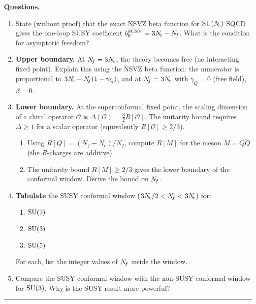 \documentclass[11pt,a4paper]{article}
\begin{document}
\medskip
\noindent\textbf{Questions.}
\begin{enumerate}[label=(\alph*)]
  \item State (without proof) that the exact NSVZ beta function for $\mathrm{SU}(N_{\!c})$
    SQCD gives the one-loop SUSY coefficient $b_0^{\mathrm{SUSY}} = 3N_{\!c} - N_{\!f}$.
    What is the condition for asymptotic freedom?

  \item \textbf{Upper boundary.}
    At $N_{\!f} = 3N_{\!c}$, the theory becomes free (no interacting fixed point).
    Explain this using the NSVZ beta function: the numerator is proportional
    to $3N_{\!c} - N_{\!f}(1 - \gamma_Q)$, and at $N_{\!f} = 3N_{\!c}$ with
    $\gamma_Q = 0$ (free field), $\beta = 0$.

  \item \textbf{Lower boundary.}
    At the superconformal fixed point, the scaling dimension of a chiral
    operator $\mathcal{O}$ is $\Delta(\mathcal{O}) = \frac{3}{2}R[\mathcal{O}]$.
    The unitarity bound requires $\Delta \geq 1$ for a scalar operator
    (equivalently $R[\mathcal{O}] \geq 2/3$).
    \begin{enumerate}[label=(\roman*)]
      \item Using $R[Q] = (N_f - N_c)/N_f$, compute $R[M]$ for the
        meson $M = Q\widetilde{Q}$ (the $R$-charges are additive).
      \item The unitarity bound $R[M] \geq 2/3$ gives the lower boundary
        of the conformal window. Derive the bound on $N_{\!f}$.
    \end{enumerate}

  \item \textbf{Tabulate} the SUSY conformal window ($3N_{\!c}/2 < N_{\!f} < 3N_{\!c}$)
    for:
    \begin{enumerate}[label=(\roman*)]
      \item $\mathrm{SU}(2)$
      \item $\mathrm{SU}(3)$
      \item $\mathrm{SU}(5)$
    \end{enumerate}
    For each, list the integer values of $N_{\!f}$ inside the window.

  \item Compare the SUSY conformal window with the non-SUSY conformal window
    for $\mathrm{SU}(3)$.  Why is the SUSY result more powerful?
\end{enumerate}

\bigskip
\hrule
\bigskip
\end{document}
